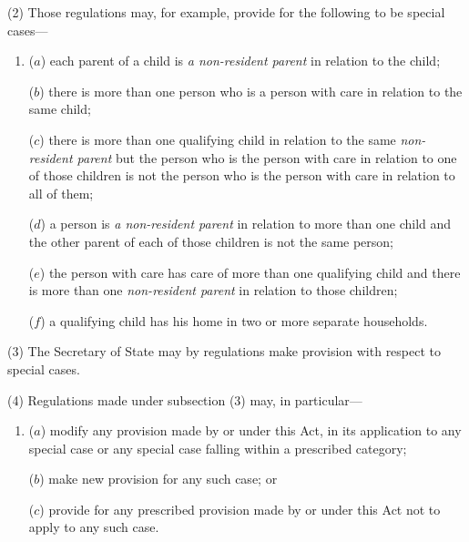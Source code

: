 \documentclass[12pt,a4paper]{article}
\begin{document}
(2) Those regulations may, for example, provide for the following to be special cases—
\begin{enumerate}\item[]
($a$) each parent of a child is 
\emph{a non-resident parent}  %
in relation to the child;

($b$) there is more than one person who is a person with care in relation to the same child;

($c$) there is more than one qualifying child in relation to the same 
\emph{non-resident parent}  %
but the person who is the person with care in relation to one of those children is not the person who is the person with care in relation to all of them;

($d$) a person is 
\emph{a non-resident parent}  %
in relation to more than one child and the other parent of each of those children is not the same person;

($e$) the person with care has care of more than one qualifying child and there is more than one 
\emph{non-resident parent}  %
in relation to those children;

($f$) a qualifying child has his home in two or more separate households.

%
\end{enumerate}

(3) The Secretary of State may by regulations make provision with respect to special cases.

(4) Regulations made under subsection (3)  may, in particular—
\begin{enumerate}\item[]
($a$) modify any provision made by or under this Act, in its application to any special case or any special case falling within a prescribed category;

($b$) make new provision for any such case; or

($c$) provide for any prescribed provision made by or under this Act not to apply to any such case.
\end{enumerate}
\end{document}

